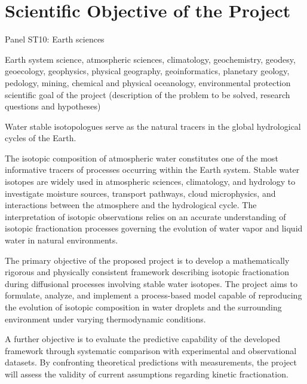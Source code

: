 \documentclass[11pt,a4paper]{article}
\begin{document}

\section{Scientific Objective of the Project}
Panel ST10: Earth sciences

Earth system science, atmospheric sciences, climatology, geochemistry, geodesy, geoecology, geophysics,
physical geography, geoinformatics, planetary geology, pedology, mining, chemical and physical oceanology,
environmental protection
scientific goal of the project (description of the problem to be solved, research questions and hypotheses)

Water stable isotopologues serve as the natural tracers in the global hydrological
cycles of the Earth.

The isotopic composition of atmospheric water constitutes one of the most informative
tracers of processes occurring within the Earth system.
Stable water isotopes are widely used in atmospheric sciences, climatology, and hydrology
to investigate moisture sources, transport pathways, cloud microphysics,
and interactions between the atmosphere and the hydrological cycle.
The interpretation of isotopic observations relies on an accurate understanding
of isotopic fractionation processes governing the evolution of water vapor
and liquid water in natural environments.

The primary objective of the proposed project is to develop a mathematically rigorous
and physically consistent
framework describing isotopic fractionation during diffusional processes
involving stable water isotopes.
The project aims to formulate, analyze, and implement a process-based model capable
of reproducing
the evolution of isotopic composition in water droplets and the surrounding environment under
varying thermodynamic conditions.

A further objective is to evaluate the predictive capability
of the developed framework through systematic
comparison with experimental and observational datasets.
By confronting theoretical predictions with measurements, the project will assess the validity
of current assumptions regarding kinetic fractionation.
\end{document}
